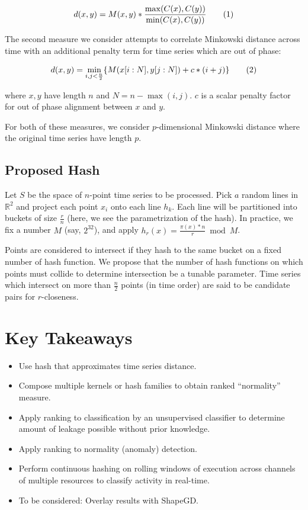 \documentclass[a4paper]{article}
\newcommand\numberthis{\addtocounter{equation}{1}\tag{\theequation}}
\begin{document}
\begin{align*}
    d(x,y) = M(x,y) * \frac{\max(C(x),C(y))}{\min(C(x),C(y))} \numberthis
\end{align*}

The second measure we consider attempts to correlate Minkowski distance across time with an additional penalty term for time series which are out of phase:

\begin{align*}
    d(x,y) = \min\limits_{i,j<\frac{n}{2}} \{ M(x[i:N],y[j:N]) + c*(i+j) \} \numberthis \\
\end{align*}

where $x,y$ have length $n$ and $N = n - \max(i,j)$.
$c$ is a scalar penalty factor for out of phase alignment between $x$ and $y$.

For both of these measures, we consider $p$-dimensional Minkowski distance where the original time series have length $p$.

\subsection{Proposed Hash}

Let $S$ be the space of $n$-point time series to be processed.
Pick $a$ random lines in $\mathbb{R}^2$ and project each point $x_i$ onto each line $h_k$.
Each line will be partitioned into buckets of size $\frac{r}{n}$ (here, we see the parametrization of the hash).
In practice, we fix a number $M$ (say, $2^{32}$), and apply $h_r(x) = \frac{\pi(x)*n}{r} \bmod M$. 

Points are considered to intersect if they hash to the same bucket on a fixed number of hash function.
We propose that the number of hash functions on which points must collide to determine intersection be a tunable parameter.
Time series which intersect on more than $\frac{n}{2}$ points (in time order) are said to be candidate pairs for $r$-closeness.

\section{Key Takeaways}

\begin{itemize}
    \item Use hash that approximates time series distance.
    \item Compose multiple kernels or hash families to obtain ranked ``normality'' measure.
    \item Apply ranking to classification by an unsupervised classifier to determine amount of leakage possible without prior knowledge.
    \item Apply ranking to normality (anomaly) detection.
    \item Perform continuous hashing on rolling windows of execution across channels of multiple resources to classify activity in real-time.
    \item To be considered: Overlay results with ShapeGD\@.
\end{itemize}



\end{document}
